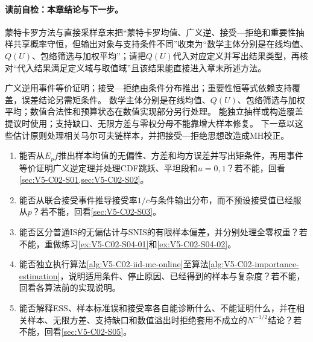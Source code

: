 \paragraph{读前自检：本章结论与下一步。}蒙特卡罗方法与直接采样章末把“蒙特卡罗均值、广义逆、接受—拒绝和重要性抽样共享概率守恒，但输出对象与支持条件不同”收束为“数学主体分别是在线均值、$Q(U)$、包络筛选与加权平均”；请把$Q(U)$代入对应定义并写出结果类型，再核对“代入结果满足定义域与取值域”且该结果能直接进入章末所述方法。\par

\begin{SLCompactClosure}
\nopagebreak[4]
\label{struct:V5-C02-CH36}
{广义逆用事件等价证明；接受—拒绝由条件分布推出；重要性恒等式依赖支持覆盖，误差结论另需矩条件。}
{数学主体分别是在线均值、$Q(U)$、包络筛选与加权平均；数值合法性和预算状态在数值实现部分另行处理。}
{能独立抽样或构造覆盖提议时使用；支持缺口、无限方差与零权分母不能靠增大样本修复。}
{下一章以这些估计原则处理相关马尔可夫链样本，并把接受—拒绝思想改造成MH校正。}

\label{struct:V5-C02-CH37}
\begin{selfcheckbox}
\begin{enumerate}[leftmargin=2.2em]
  \item 能否从$E_pf$推出样本均值的无偏性、方差和均方误差并写出矩条件，再用事件等价证明广义逆定理并处理CDF跳跃、平坦段和$u=0,1$？若不能，回看\cref{sec:V5-C02-S01,sec:V5-C02-S02}。
  \item 能否从联合接受事件推导接受率$1/c$与条件输出分布，而不预设接受值已经服从$p$？若不能，回看\cref{sec:V5-C02-S03}。
  \item 能否区分普通IS的无偏估计与SNIS的有限样本偏差，并分别处理全零权重？若不能，重做练习\ref{ex:V5-C02-S04-01}和\ref{ex:V5-C02-S04-02}。
  \item 能否独立执行算法\ref{alg:V5-C02-iid-mc-online}至算法\ref{alg:V5-C02-importance-estimation}，说明适用条件、停止原因、已经得到的样本与复杂度？若不能，回看各算法前的实现说明。
  \item 能否解释ESS、样本标准误和接受率各自能诊断什么、不能证明什么，并在相关样本、无限方差、支持缺口和数值溢出时拒绝套用不成立的$N^{-1/2}$结论？若不能，回看\cref{sec:V5-C02-S05}。
\end{enumerate}
\end{selfcheckbox}
\end{SLCompactClosure}
